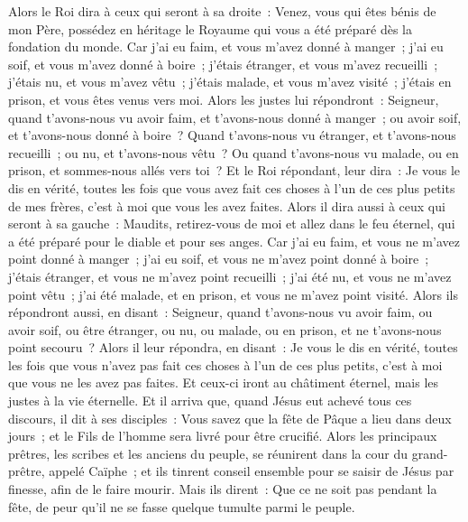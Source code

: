 \begin{multicols}{2}
Alors le Roi dira à ceux qui seront à sa droite~: Venez, vous qui êtes bénis de mon Père, possédez en héritage le Royaume qui vous a été préparé dès la fondation du monde.
Car j'ai eu faim, et vous m'avez donné à manger~; j'ai eu soif, et vous m'avez donné à boire~; j'étais étranger, et vous m'avez recueilli~;
j'étais nu, et vous m'avez vêtu~; j'étais malade, et vous m'avez visité~; j'étais en prison, et vous êtes venus vers moi.
Alors les justes lui répondront~: Seigneur, quand t'avons-nous vu avoir faim, et t'avons-nous donné à manger~; ou avoir soif, et t'avons-nous donné à boire~?
Quand t'avons-nous vu étranger, et t'avons-nous recueilli~; ou nu, et t'avons-nous vêtu~?
Ou quand t'avons-nous vu malade, ou en prison, et sommes-nous allés vers toi~?
Et le Roi répondant, leur dira~: Je vous le dis en vérité, toutes les fois que vous avez fait ces choses à l'un de ces plus petits de mes frères, c'est à moi que vous les avez faites.
Alors il dira aussi à ceux qui seront à sa gauche~: Maudits, retirez-vous de moi et allez dans le feu éternel, qui a été préparé pour le diable et pour ses anges.
Car j'ai eu faim, et vous ne m'avez point donné à manger~; j'ai eu soif, et vous ne m'avez point donné à boire~;
j'étais étranger, et vous ne m'avez point recueilli~; j'ai été nu, et vous ne m'avez point vêtu~; j'ai été malade, et en prison, et vous ne m'avez point visité.
Alors ils répondront aussi, en disant~: Seigneur, quand t'avons-nous vu avoir faim, ou avoir soif, ou être étranger, ou nu, ou malade, ou en prison, et ne t'avons-nous point secouru~?
Alors il leur répondra, en disant~: Je vous le dis en vérité, toutes les fois que vous n'avez pas fait ces choses à l'un de ces plus petits, c'est à moi que vous ne les avez pas faites.
Et ceux-ci iront au châtiment éternel, mais les justes à la vie éternelle.
\VerseOne{}Et il arriva que, quand Jésus eut achevé tous ces discours, il dit à ses disciples~:
Vous savez que la fête de Pâque a lieu dans deux jours~; et le Fils de l'homme sera livré pour être crucifié.
Alors les principaux prêtres, les scribes et les anciens du peuple, se réunirent dans la cour du grand-prêtre, appelé Caïphe~;
et ils tinrent conseil ensemble pour se saisir de Jésus par finesse, afin de le faire mourir.
Mais ils dirent~: Que ce ne soit pas pendant la fête, de peur qu'il ne se fasse quelque tumulte parmi le peuple.

\end{multicols}
